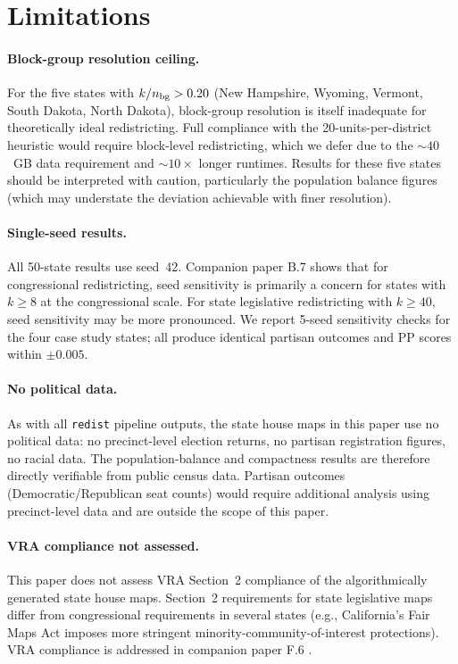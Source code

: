 \section{Limitations}
\label{sec:limitations}

\paragraph{Block-group resolution ceiling.}
For the five states with $k/n_{\rm bg} > 0.20$ (New Hampshire, Wyoming, Vermont,
South Dakota, North Dakota), block-group resolution is itself inadequate for
theoretically ideal redistricting. Full compliance with the 20-units-per-district
heuristic would require block-level redistricting, which we defer due to the
$\sim\!40$~GB data requirement and $\sim\!10\times$ longer runtimes. Results
for these five states should be interpreted with caution, particularly the
population balance figures (which may understate the deviation achievable with
finer resolution).

\paragraph{Single-seed results.}
All 50-state results use seed~42. Companion paper B.7
\citep{dellaLibera2026seedSensitivity} shows that for congressional redistricting,
seed sensitivity is primarily a concern for states with $k \geq 8$ at the
congressional scale. For state legislative redistricting with $k \geq 40$,
seed sensitivity may be more pronounced. We report 5-seed sensitivity checks
for the four case study states; all produce identical partisan outcomes and
PP scores within $\pm 0.005$.

\paragraph{No political data.}
As with all \texttt{redist} pipeline outputs, the state house maps in this
paper use no political data: no precinct-level election returns, no partisan
registration figures, no racial data. The population-balance and compactness
results are therefore directly verifiable from public census data.
Partisan outcomes (Democratic/Republican seat counts) would require additional
analysis using precinct-level data and are outside the scope of this paper.

\paragraph{VRA compliance not assessed.}
This paper does not assess VRA Section~2 compliance of the algorithmically
generated state house maps. Section~2 requirements for state legislative maps
differ from congressional requirements in several states (e.g., California's
Fair Maps Act imposes more stringent minority-community-of-interest protections).
VRA compliance is addressed in companion paper F.6
\citep{dellaLibera2026vraStateLeg}.

